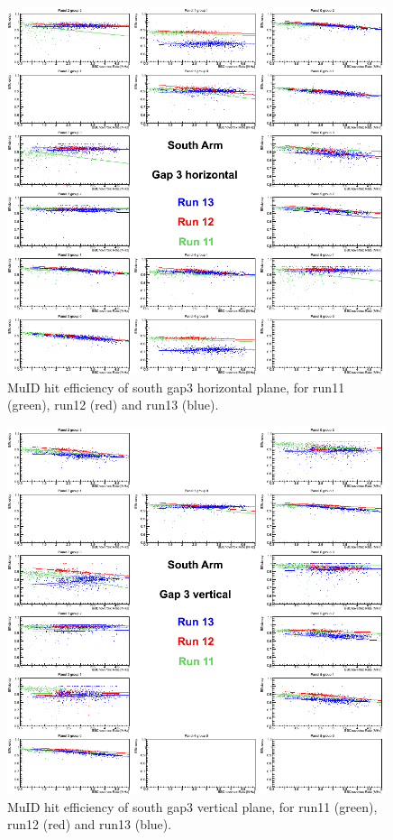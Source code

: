 \begin{figure}[h!]

  \centering
  \includegraphics[width=0.99\textwidth]{./figures/efficomp_South_gap3_horizontal.png}
  \caption{\label{Fig:efficiency:MuIdEff:a0g3p0}MuID hit efficiency of south gap3 horizontal plane, for run11 (green), run12 (red) and run13 (blue).}
\end{figure}
\clearpage


\begin{figure}[h!]

  \centering
  \includegraphics[width=0.99\textwidth]{./figures/efficomp_South_gap3_vertical.png}
  \caption{\label{Fig:efficiency:MuIdEff:a0g3p1}MuID hit efficiency of south gap3 vertical plane, for run11 (green), run12 (red) and run13 (blue).}
\end{figure}
\clearpage


